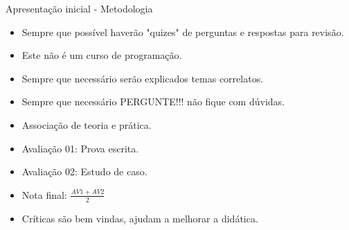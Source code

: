 
\begin{frame}{Apresentação inicial - Metodologia}
    \begin{itemize}
        \item Sempre que possível haverão "quizes" de perguntas e respostas para revisão.
        \item Este não é um curso de programação.
        \item Sempre que necessário serão explicados temas correlatos.
        \item Sempre que necessário PERGUNTE!!! não fique com dúvidas.
        \item Associação de teoria e prática.
        \item Avaliação 01: Prova escrita.
        \item Avaliação 02: Estudo de caso.
        \item Nota final: $\frac{AV1 + AV2}{2}$
        \item Críticas são bem vindas, ajudam a melhorar a didática.
    \end{itemize}
\end{frame}